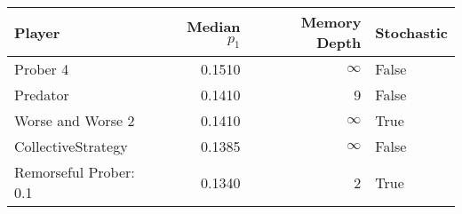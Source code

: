 \begin{tabular}{lrrl}
\toprule
                 Player &  Median $p_1$ &  Memory Depth & Stochastic \\
\midrule
               Prober 4 &        0.1510 &            \(\infty\) &      False \\
               Predator &        0.1410 &             9 &      False \\
      Worse and Worse 2 &        0.1410 &            \(\infty\) &       True \\
     CollectiveStrategy &        0.1385 &            \(\infty\) &      False \\
 Remorseful Prober: 0.1 &        0.1340 &             2 &       True \\
\bottomrule
\end{tabular}
